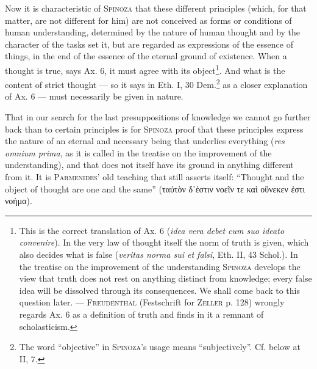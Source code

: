 \documentclass[12pt]{article}
\begin{document}
Now it is characteristic of \textsc{Spinoza} that these different principles (which,
for that matter, are not different for him) are not conceived as forms or conditions
of human understanding, determined by the nature of human thought and by the character
of the tasks set it, but are regarded as expressions of the essence of things, in the
end of the essence of the eternal ground of existence. When a thought is true, says
Ax. 6, it must agree with its object\footnote{This is the correct translation of Ax.
6 (\textit{idea vera debet cum suo ideato convenire}). In the very law of thought
itself the norm of truth is given, which also decides what is false (\textit{veritas
norma sui et falsi}, Eth. II, 43 Schol.). In the treatise on the improvement of the
understanding \textsc{Spinoza} develops the view that truth does not rest on anything
distinct from knowledge; every false idea will be dissolved through its consequences.
We shall come back to this question later. --- \textsc{Freudenthal} (Festschrift for
\textsc{Zeller} p. 128) wrongly regards Ax. 6 as a definition of truth and finds in it
a remnant of scholasticism.}. And what is the content of strict thought --- so it says
in Eth. I, 30 Dem.\footnote{The word ``objective'' in \textsc{Spinoza}'s usage means
``subjectively''. Cf. below at II, 7.} as a closer explanation of Ax. 6 --- must
necessarily be given in nature.

That in our search for the last presuppositions of knowledge we cannot go further back
than to certain principles is for \textsc{Spinoza} proof that these principles express
the nature of an eternal and necessary being that underlies everything (\textit{res
omnium prima}, as it is called in the treatise on the improvement of the
understanding), and that does not itself have its ground in anything different from
it. It is \textsc{Parmenides}' old teaching that still asserts itself: ``Thought and
the object of thought are one and the same'' (ταὐτὸν δ᾽ἐστιν νοεῖν τε καὶ οὓνεκεν ἐστι
νοήμα).
\end{document}
